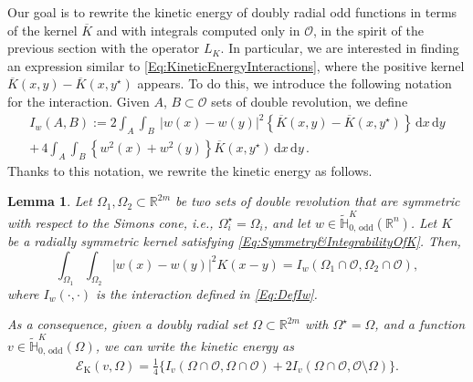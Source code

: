 \documentclass[12pt,reqno]{amsart}
\newtheorem{lemma}[theorem]{Lemma}
\theoremstyle{definition}
\theoremstyle{remark}
\newcommand{\con}[1]{\mathbb{#1}}
\newcommand{\R}{\con{R}} %
\renewcommand{\H}{\con{H}}
\newcommand{\ecal}{\mathcal{E}}
\newcommand{\ocal}{\mathcal{O}}
\renewcommand{\d}{\,\mathrm{d}} %
\numberwithin{equation}{section}
\begin{document}
	Our goal is to rewrite the kinetic energy of doubly radial odd functions in terms of the kernel $\overline{K}$ and with integrals computed only in $\ocal$, in the spirit of the previous section with the operator $L_K$. In particular, we are interested in finding an expression similar to \eqref{Eq:KineticEnergyInteractions}, where the positive kernel $\overline{K}(x,y) - \overline{K}(x,y^\star)$ appears. To do this, we introduce the following notation for the interaction. Given $A$, $B\subset \ocal$ sets of double revolution, we define
	\begin{equation}
	\label{Eq:DefIw}
	\begin{split}
	I_w(A,B) := 2\int_A  \int_B  \ |w(x)-w(y)|^2 \left\{ \overline{K}(x,y) - \overline{K}(x,y^\star) \right\} \d x \d y  \\
	+\, 4 \int_A  \int_B  \left\{w^2(x)+w^2(y)\right\} \overline{K}(x,y^\star) \d x \d y\,.
	\end{split}
	\end{equation}
	Thanks to this notation, we rewrite the kinetic energy as follows.
	
	
	\begin{lemma}
		\label{Lemma:ShortExpressionEnergy}
		Let $\Omega_1, \Omega_2 \subset \R^{2m}$ be two sets of double revolution that are symmetric with respect to the Simons cone, i.e., $\Omega_i^\star = \Omega_i$, and let $w\in \widetilde{\H}^K_{0,\, \mathrm{odd}}(\R^n)$. Let $K$ be a radially symmetric kernel satisfying \eqref{Eq:Symmetry&IntegrabilityOfK}. Then, 
		\begin{equation}
		\label{Eq:InteractionsEquality}
		\int_{\Omega_1} \int_{\Omega_2} |w(x)-w(y)|^2 K(x-y) = I_w(\Omega_1\cap \ocal, \Omega_2\cap \ocal),
		\end{equation}
		where $I_w(\cdot, \cdot)$ is the interaction defined in \eqref{Eq:DefIw}.
		
		As a consequence, given a doubly radial set $\Omega\subset \R^{2m}$ with $\Omega^\star = \Omega$, and a function $v\in \widetilde{\H}^K_{0,\, \mathrm{odd}}(\Omega)$, we can write the kinetic energy as
		\begin{align}
		\label{Eq:ShortExpressionEnergy}
		\ecal_\mathrm{K}(v, \Omega) = \frac{1}{4} \big \{I_v(\Omega\cap\ocal,\Omega\cap\ocal) +  2I_v(\Omega\cap\ocal,\ocal\setminus\Omega) \big \}.
		\end{align}
		
	\end{lemma}
	
\end{document}
